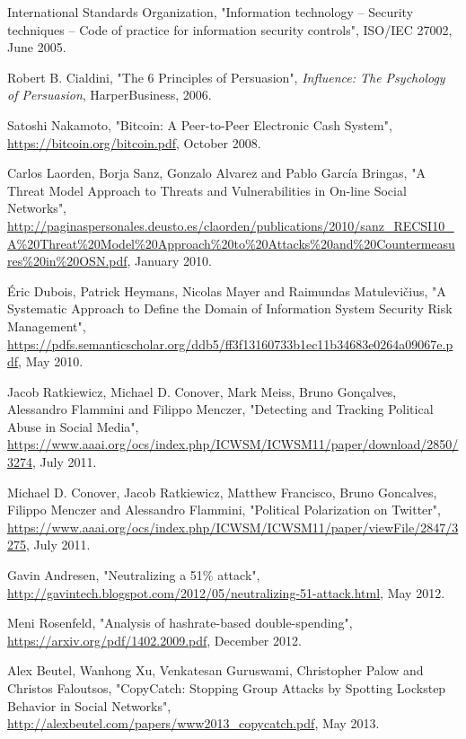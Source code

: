 \documentclass[12pt,a4paper]{article}
\begin{document}
\newpage
\begin{thebibliography}{9}

International Standards Organization,
"Information technology -- Security techniques -- Code of practice for information security controls",
ISO/IEC 27002,
June 2005.

Robert B. Cialdini,
"The 6 Principles of Persuasion",
\textit{Influence: The Psychology of Persuasion},
HarperBusiness, 2006.

Satoshi Nakamoto,
"Bitcoin: A Peer-to-Peer Electronic Cash System",
\url{https://bitcoin.org/bitcoin.pdf},
October 2008.

Carlos Laorden, Borja Sanz, Gonzalo Alvarez and Pablo García Bringas,
"A Threat Model Approach to Threats and Vulnerabilities in On-line Social Networks",
\url{http://paginaspersonales.deusto.es/claorden/publications/2010/sanz_RECSI10_A%20Threat%20Model%20Approach%20to%20Attacks%20and%20Countermeasures%20in%20OSN.pdf},
January 2010.

Éric Dubois, Patrick Heymans, Nicolas Mayer and Raimundas Matulevičius,
"A Systematic Approach to Define the Domain of Information System Security Risk Management",
\url{https://pdfs.semanticscholar.org/ddb5/ff3f13160733b1ec11b34683e0264a09067e.pdf},
May 2010.

Jacob Ratkiewicz, Michael D. Conover, Mark Meiss, Bruno Gonçalves, Alessandro Flammini and Filippo Menczer,
"Detecting and Tracking Political Abuse in Social Media",
\url{https://www.aaai.org/ocs/index.php/ICWSM/ICWSM11/paper/download/2850/3274},
July 2011.

Michael D. Conover, Jacob Ratkiewicz, Matthew Francisco, Bruno Goncalves, Filippo Menczer and Alessandro Flammini,
"Political Polarization on Twitter",
\url{https://www.aaai.org/ocs/index.php/ICWSM/ICWSM11/paper/viewFile/2847/3275},
July 2011.

Gavin Andresen,
"Neutralizing a 51\% attack",
\url{http://gavintech.blogspot.com/2012/05/neutralizing-51-attack.html},
May 2012.

Meni Rosenfeld,
"Analysis of hashrate-based double-spending",
\url{https://arxiv.org/pdf/1402.2009.pdf},
December 2012.

Alex Beutel, Wanhong Xu, Venkatesan Guruswami, Christopher Palow and Christos Faloutsos,
"CopyCatch: Stopping Group Attacks by Spotting Lockstep Behavior in Social Networks",
\url{http://alexbeutel.com/papers/www2013_copycatch.pdf},
May 2013.


\end{thebibliography}
\end{document}

